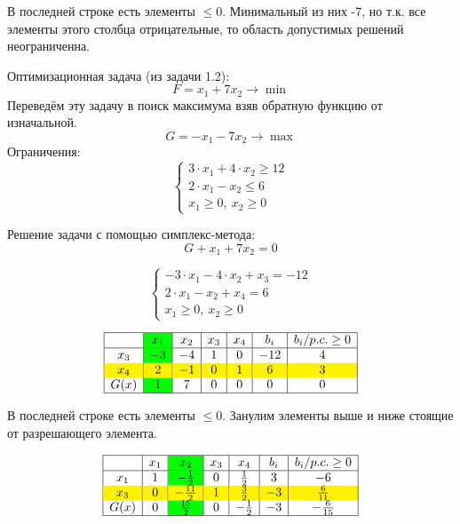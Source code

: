 \documentclass{article}
\begin{document}
В последней строке есть элементы \(\leq 0\). Минимальный из них -7, но т.к. все элементы этого столбца отрицательные, то область допустимых решений неограниченна.


Оптимизационная задача (из задачи 1.2):
\[
    F = x_1 + 7x_2 \to \min
\]
Переведём эту задачу в поиск максимума взяв обратную функцию от изначальной.
\[
    G = -x_1 - 7x_2 \to \max
\]
Ограничения:
\[
    \begin{cases}
        3 \cdot x_1 + 4 \cdot x_2 \geq 12 \\
        2 \cdot x_1 - x_2 \leq 6          \\
        x_1 \geq 0, \ x_2 \geq 0
    \end{cases}
\]

Решение задачи с помощью симплекс-метода:
\[
    G + x_1 + 7x_2 = 0
\]

\[
    \begin{cases}
        -3 \cdot x_1 - 4 \cdot x_2 + x_3 =  -12 \\
        2 \cdot x_1 - x_2 + x_4 = 6             \\
        x_1 \geq 0, \ x_2 \geq 0
    \end{cases}
\]

\vspace{25pt}

\[
    \begin{array}{|c|>{\columncolor{green}}c|c|c|c|c|c|}
        \hline
             & x_1 & x_2 & x_3 & x_4 & b_i & b_i/p.c. \geq 0 \\
        \hline
        x_3  & -3  & -4  & 1   & 0   & -12 & 4               \\
        \rowcolor{yellow}
        x_4  & 2   & -1  & 0   & 1   & 6   & 3               \\
        G(x) & 1   & 7   & 0   & 0   & 0   & 0               \\
        \hline
    \end{array}
\]

В последней строке есть элементы \(\leq 0\). Занулим элементы выше и ниже стоящие от разрешающего элемента.

\[
    \begin{array}{|c|c|>{\columncolor{green}}c|c|c|c|c|}
        \hline
             & x_1 & x_2           & x_3 & x_4          & b_i & b_i/p.c. \geq 0 \\
        \hline
        x_1  & 1   & -\frac{1}{2}  & 0   & \frac{1}{2}  & 3   & -6              \\
        \rowcolor{yellow}
        x_3  & 0   & -\frac{11}{2} & 1   & \frac{3}{2}  & -3  & \frac{6}{11}    \\
        G(x) & 0   & \frac{15}{2}  & 0   & -\frac{1}{2} & -3  & -\frac{6}{15}   \\
        \hline
    \end{array}
\]
\end{document}
